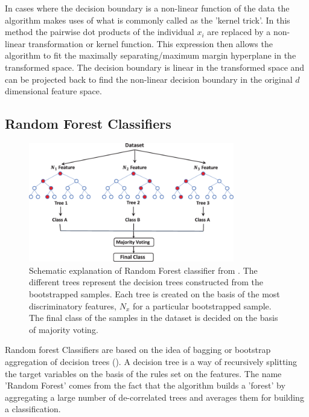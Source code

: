 \documentclass[msthesis.tex]{subfiles}
\begin{document}
In cases where the decision boundary is a non-linear function of the data the algorithm makes uses of what is commonly called as the 'kernel trick'. In this method the pairwise dot products of the individual $x_i$ are replaced by a non-linear transformation or kernel function. This expression then allows the algorithm to fit the maximally separating/maximum margin hyperplane in the transformed space. The decision boundary is linear in the transformed space and can be projected back to find the non-linear decision boundary in the original $d$ dimensional feature space. 
\subsection{Random Forest Classifiers}
\begin{figure}
    \centering
    \includegraphics[width=0.8\textwidth]{images/Random_forest.png}
    \caption{Schematic explanation of Random Forest classifier from \cite{TAHMASEBI2020103619}. The different trees represent the decision trees constructed from the bootstrapped samples. Each tree is created on the basis of the most discriminatory features, $N_x$ for a particular bootstrapped sample. The final class of the samples in the dataset is decided on the basis of majority voting.}
    \label{fig:random_forests}
\end{figure}
Random forest Classifiers are based on the idea of bagging or bootstrap aggregation of decision trees (\cite{hastie2009elements}). A decision tree is a way of recursively splitting the target variables on the basis of the rules set on the features. The name 'Random Forest' comes from the fact that the algorithm builds a 'forest' by aggregating a large number of de-correlated trees and averages them for building a classification. 
\end{document}
